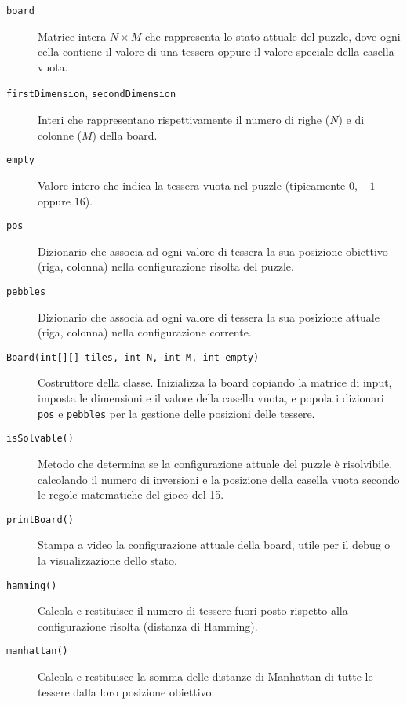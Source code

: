 \begin{description}
    \item[\texttt{board}] 
        Matrice intera $N \times M$ che rappresenta lo stato attuale del puzzle, dove ogni cella contiene il valore di una tessera oppure il valore speciale della casella vuota.
        
    \item[\texttt{firstDimension}, \texttt{secondDimension}] 
        Interi che rappresentano rispettivamente il numero di righe ($N$) e di colonne ($M$) della board.
        
    \item[\texttt{empty}] 
        Valore intero che indica la tessera vuota nel puzzle (tipicamente $0$, $-1$ oppure $16$).
        
    \item[\texttt{pos}] 
        Dizionario che associa ad ogni valore di tessera la sua posizione obiettivo (riga, colonna) nella configurazione risolta del puzzle.
        
    \item[\texttt{pebbles}] 
        Dizionario che associa ad ogni valore di tessera la sua posizione attuale (riga, colonna) nella configurazione corrente.
        
    \item[\texttt{Board(int[][] tiles, int N, int M, int empty)}] 
        Costruttore della classe. Inizializza la board copiando la matrice di input, imposta le dimensioni e il valore della casella vuota, e popola i dizionari \texttt{pos} e \texttt{pebbles} per la gestione delle posizioni delle tessere.
        
    \item[\texttt{isSolvable()}] 
        Metodo che determina se la configurazione attuale del puzzle è risolvibile, calcolando il numero di inversioni e la posizione della casella vuota secondo le regole matematiche del gioco del 15.
        
    \item[\texttt{printBoard()}] 
        Stampa a video la configurazione attuale della board, utile per il debug o la visualizzazione dello stato.
        
    \item[\texttt{hamming()}] 
        Calcola e restituisce il numero di tessere fuori posto rispetto alla configurazione risolta (distanza di Hamming).
        
    \item[\texttt{manhattan()}] 
        Calcola e restituisce la somma delle distanze di Manhattan di tutte le tessere dalla loro posizione obiettivo.
        

\end{description}
